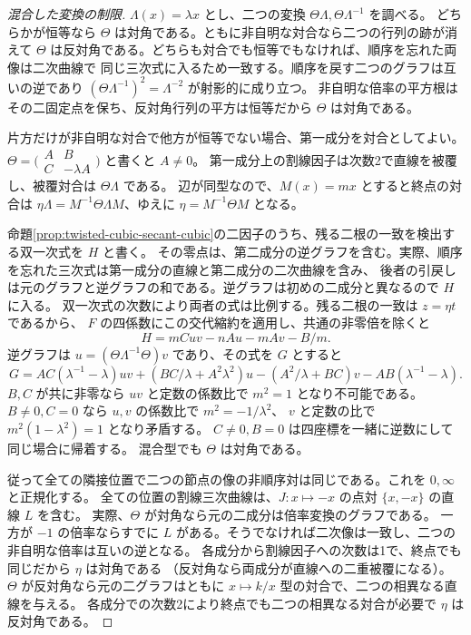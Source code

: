 \begin{proof}[混合した変換の制限]
$\Lambda(x)=\lambda x$ とし、二つの変換 $\Theta\Lambda,\Theta\Lambda^{-1}$ を調べる。
どちらかが恒等なら $\Theta$ は対角である。ともに非自明な対合なら二つの行列の跡が消えて
$\Theta$ は反対角である。どちらも対合でも恒等でもなければ、順序を忘れた両像は二次曲線で
同じ三次式に入るため一致する。順序を戻す二つのグラフは互いの逆であり
$(\Theta\Lambda^{-1})^2=\Lambda^{-2}$ が射影的に成り立つ。
非自明な倍率の平方根はその二固定点を保ち、反対角行列の平方は恒等だから $\Theta$ は対角である。

片方だけが非自明な対合で他方が恒等でない場合、第一成分を対合としてよい。
$\Theta=\bigl(\begin{smallmatrix}A&B\\C&-\lambda A\end{smallmatrix}\bigr)$ と書くと $A\ne0$。
第一成分上の割線因子は次数2で直線を被覆し、被覆対合は $\Theta\Lambda$ である。
辺が同型なので、$M(x)=mx$ とすると終点の対合は
$\eta\Lambda=M^{-1}\Theta\Lambda M$、ゆえに $\eta=M^{-1}\Theta M$ となる。

命題\ref{prop:twisted-cubic-secant-cubic}の二因子のうち、残る二根の一致を検出する双一次式を $H$ と書く。
その零点は、第二成分の逆グラフを含む。実際、順序を忘れた三次式は第一成分の直線と第二成分の二次曲線を含み、
後者の引戻しは元のグラフと逆グラフの和である。逆グラフは初めの二成分と異なるので $H$ に入る。
双一次式の次数により両者の式は比例する。残る二根の一致は $z=\eta t$ であるから、
$F$ の四係数にこの交代縮約を適用し、共通の非零倍を除くと
\[
 H=m Cuv-nAu-mAv-B/m .
\]
逆グラフは $u=(\Theta\Lambda^{-1}\Theta)v$ であり、その式を $G$ とすると
\[
 G=AC(\lambda^{-1}-\lambda)uv+
 (BC/\lambda+A^2\lambda^2)u-(A^2/\lambda+BC)v-AB(\lambda^{-1}-\lambda).
\]
$B,C$ が共に非零なら $uv$ と定数の係数比で $m^2=1$ となり不可能である。
$B\ne0,C=0$ なら $u,v$ の係数比で $m^2=-1/\lambda^2$、
$v$ と定数の比で $m^2(1-\lambda^2)=1$ となり矛盾する。
$C\ne0,B=0$ は四座標を一緒に逆数にして同じ場合に帰着する。
混合型でも $\Theta$ は対角である。

従って全ての隣接位置で二つの節点の像の非順序対は同じである。これを $0,\infty$ と正規化する。
全ての位置の割線三次曲線は、$J:x\mapsto-x$ の点対 $\{x,-x\}$ の直線 $L$ を含む。
実際、$\Theta$ が対角なら元の二成分は倍率変換のグラフである。
一方が $-1$ の倍率ならすでに $L$ がある。そうでなければ二次像は一致し、二つの非自明な倍率は互いの逆となる。
各成分から割線因子への次数は1で、終点でも同じだから $\eta$ は対角である
（反対角なら両成分が直線への二重被覆になる）。
$\Theta$ が反対角なら元の二グラフはともに $x\mapsto k/x$ 型の対合で、二つの相異なる直線を与える。
各成分での次数2により終点でも二つの相異なる対合が必要で $\eta$ は反対角である。


\end{proof}
